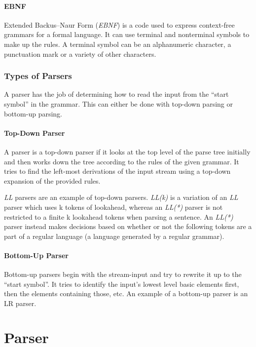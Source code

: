\documentclass{report}
\begin{document}
\subsubsection{EBNF}

Extended Backus–Naur Form (\emph{EBNF}) is a code used to express context-free grammars for a formal language. It can use terminal and nonterminal symbols to make up the rules. A terminal symbol can be an alphanumeric character, a punctuation mark or a variety of other characters.

\subsection{Types of Parsers}

A parser has the job of determining how to read the input from the ``start symbol'' in the grammar. This can either be done with top-down parsing or bottom-up parsing. 

\subsubsection{Top-Down Parser}

A parser is a top-down parser if it looks at the top level of the parse tree initially and then works down the tree according to the rules of the given grammar. It tries to find the left-most derivations of the input stream using a top-down expansion of the provided rules.

\emph{LL} parsers are an example of top-down parsers. \emph{LL(k)} is a variation of an \emph{LL} parser which uses k tokens of lookahead, whereas an \emph{LL(*)} parser is not restricted to a finite k lookahead tokens when parsing a sentence. An \emph{LL(*)} parser instead makes decisions based on whether or not the following tokens are a part of a regular language (a language generated by a regular grammar).

\subsubsection{Bottom-Up Parser}

Bottom-up parsers begin with the stream-input and try to rewrite it up to the ``start symbol''. It tries to identify the input's lowest level basic elements first, then the elements containing those, etc. An example of a bottom-up parser is an LR parser.

\chapter{Parser}
\label{chap:parser}
\end{document}

